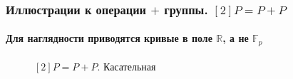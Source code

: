\begin{frame}
    \frametitle{Иллюстрации к операции $+$ группы. $[2]P=P+P$}
    \framesubtitle{Для наглядности приводятся кривые в поле $\mathbb{R}$, а не $\mathbb{F}_p$}

    \begin{figure}
        \begin{center}
            \caption{$[2]P=P+P$. Касательная}\label{pict:elliptic2x}
        \end{center}
    \end{figure} 
\end{frame}


